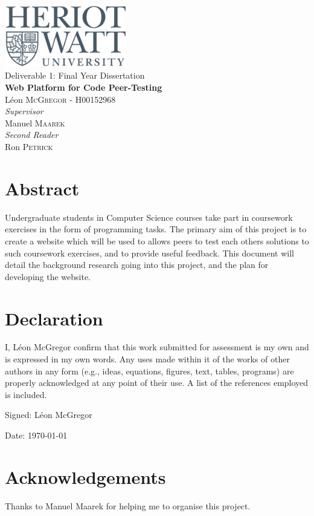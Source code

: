 \documentclass[a4paper,11pt]{report}
\newcommand{\titles}{\\\vspace{1cm}}
\begin{document}

\pagestyle{empty}

{\centering\Large
\includegraphics[width=0.4\textwidth]{../hwu.png}\titles
Deliverable 1: Final Year Dissertation\titles
{\huge\bfseries Web Platform for Code Peer-Testing\titles}
L\'eon \textsc{McGregor} - H00152968\titles
{\large\textit{Supervisor}\\}
Manuel \textsc{Maarek}\titles
{\large\textit{Second Reader}\\}
Ron \textsc{Petrick}\\
\vfill
}

\newpage
{
  \renewcommand{\thispagestyle}[1]{}
  \tableofcontents
}
\newpage
\doublespacing


\section*{Abstract}
Undergraduate students in Computer Science courses take part in coursework exercises in the form of programming tasks. The primary aim of this project is to create a website which will be used to allows peers to test each others solutions to such coursework exercises, and to provide useful feedback. This document will detail the background research going into this project, and the plan for developing the website.

\vfill

\section*{Declaration}
I, L\'eon McGregor confirm that this work submitted for assessment is my own and is expressed in my own words. Any uses made within it of the works of other authors in any form (e.g., ideas, equations, figures, text, tables, programs) are properly acknowledged at any point of their use. A list of the references employed is included.\par
Signed: L\'eon McGregor\par
Date: \today

\vfill

\section*{Acknowledgements}
Thanks to Manuel Maarek for helping me to organise this project.
\end{document}

